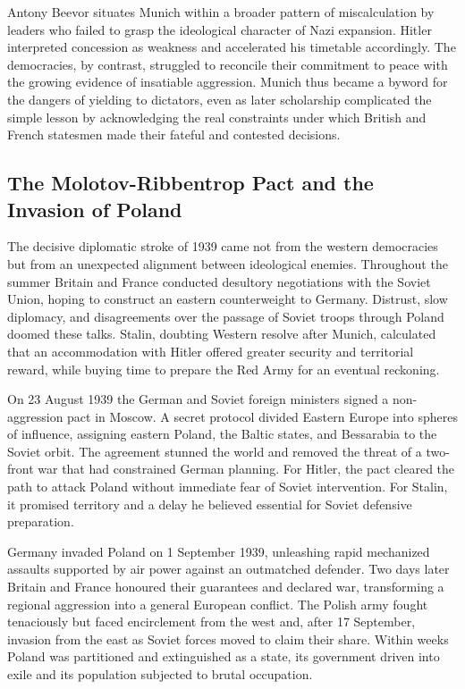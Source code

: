 Antony Beevor situates Munich within a broader pattern of miscalculation by leaders who failed to grasp the ideological character of Nazi expansion. Hitler interpreted concession as weakness and accelerated his timetable accordingly. The democracies, by contrast, struggled to reconcile their commitment to peace with the growing evidence of insatiable aggression. Munich thus became a byword for the dangers of yielding to dictators, even as later scholarship complicated the simple lesson by acknowledging the real constraints under which British and French statesmen made their fateful and contested decisions. \cite{beevor2012} \cite{weinberg1994} \cite{kershaw2000}

\subsection{The Molotov-Ribbentrop Pact and the Invasion of Poland}
The decisive diplomatic stroke of 1939 came not from the western democracies but from an unexpected alignment between ideological enemies. Throughout the summer Britain and France conducted desultory negotiations with the Soviet Union, hoping to construct an eastern counterweight to Germany. Distrust, slow diplomacy, and disagreements over the passage of Soviet troops through Poland doomed these talks. Stalin, doubting Western resolve after Munich, calculated that an accommodation with Hitler offered greater security and territorial reward, while buying time to prepare the Red Army for an eventual reckoning.

On 23 August 1939 the German and Soviet foreign ministers signed a non-aggression pact in Moscow. A secret protocol divided Eastern Europe into spheres of influence, assigning eastern Poland, the Baltic states, and Bessarabia to the Soviet orbit. The agreement stunned the world and removed the threat of a two-front war that had constrained German planning. For Hitler, the pact cleared the path to attack Poland without immediate fear of Soviet intervention. For Stalin, it promised territory and a delay he believed essential for Soviet defensive preparation.

Germany invaded Poland on 1 September 1939, unleashing rapid mechanized assaults supported by air power against an outmatched defender. Two days later Britain and France honoured their guarantees and declared war, transforming a regional aggression into a general European conflict. The Polish army fought tenaciously but faced encirclement from the west and, after 17 September, invasion from the east as Soviet forces moved to claim their share. Within weeks Poland was partitioned and extinguished as a state, its government driven into exile and its population subjected to brutal occupation.

